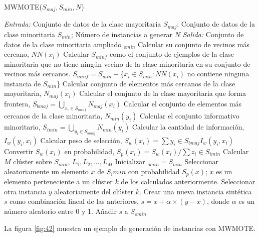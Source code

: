 \newpage

\begin{algorithm}[H]
	\caption{MWMOTE($S_{maj},S_{min},N$)}
	\label{algo:mwmote}
	\begin{algorithmic}[0]
		\State \textit{Entrada:} Conjunto de datos de la clase mayoritaria $S_{maj}$; Conjunto de datos de la clase minoritaria $S_{min}$; Número de instancias a generar $N$
		\State \textit{Salida:} Conjunto de datos de la clase minoritaria ampliado $_{omin}$
			\State Calcular su conjunto de vecinos más cercano, $NN(x_i)$
		\EndFor
		\State Calcular $S_{minf}$ como el conjunto de ejemplos de la clase minoritaria que no tiene ningún vecino de la clase minoritaria en su conjunto de vecinos más cercanos. $S_{minf} = S_{min} - \{x_i \in S_{min} : NN(x_i) $ no contiene ninguna instancia de $S_{min}  \}$
			\State Calcular conjunto de elementos más cercanos de la clase mayoritaria, $N_{maj}(x_i)$
		\EndFor
		\State Calcular el conjunto de la clase mayoritaria que forma frontera, $S_{bmaj} = \bigcup_{x_i \in S_{minf} } N_{maj}(x_i)$
			\State Calcular el conjunto de elementos más cercanos de la clase minoritaria, $N_{min} (y_i)$
		\EndFor
		\State Calcular el conjunto informativo minoritario, $S_{imin} = \bigcup_{y_i \in S_{bmaj}} N_{min}(y_i)$
			\State Calcular la cantidad de información, $I_w(y_i,x_i)$
		\EndFor
			\State Calcular peso de selección, $S_w(x_i) = \sum{y_i \in S_{bmaj}} I_w(y_i,x_i)$
		\EndFor
			\State Convertir $S_w(x_i)$ en probabilidad, $S_p(x_i) = S_w(x_i)/\sum{z_i \in S_{imin}}$
		\EndFor
		\State Calcular $M$ clúster sobre $S_{min}$, $L_1, L_2, ..., L_M$
		\State Inicializar $_{omin} = S_{min}$
			\State Seleccionar aleatoriamente un elemento $x$ de $S_imin$ con probabilidad $S_p(x)$; $x$ es un elemento perteneciente a un clúster $k$ de los calculados anteriormente.
			\State Seleccionar otra instancia $y$ aleatoriamente del clúster $k$.
			\State Crear una nueva instancia sintética $s$ como combinación lineal de las anteriores, $s = x + \alpha \times (y-x)$, donde $\alpha$ es un número aleatorio entre 0 y 1.
			\State Añadir $s$ a $S_{omin}$
		\EndFor
	\end{algorithmic}
\end{algorithm}

La figura \ref{fig:42} muestra un ejemplo de generación de instancias con MWMOTE.\newline


